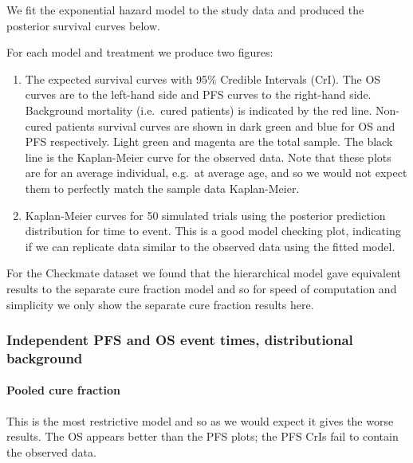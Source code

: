 \documentclass[
]{article}
\begin{document}
We fit the exponential hazard model to the study data and produced the
posterior survival curves below.

For each model and treatment we produce two figures:

\begin{enumerate}
\def\labelenumi{\arabic{enumi}.}
\item
  The expected survival curves with 95\% Credible Intervals (CrI). The
  OS curves are to the left-hand side and PFS curves to the right-hand
  side. Background mortality (i.e.~cured patients) is indicated by the
  red line. Non-cured patients survival curves are shown in dark green
  and blue for OS and PFS respectively. Light green and magenta are the
  total sample. The black line is the Kaplan-Meier curve for the
  observed data. Note that these plots are for an average individual,
  e.g.~at average age, and so we would not expect them to perfectly
  match the sample data Kaplan-Meier.
\item
  Kaplan-Meier curves for 50 simulated trials using the posterior
  prediction distribution for time to event. This is a good model
  checking plot, indicating if we can replicate data similar to the
  observed data using the fitted model.
\end{enumerate}

For the Checkmate dataset we found that the hierarchical model gave
equivalent results to the separate cure fraction model and so for speed
of computation and simplicity we only show the separate cure fraction
results here.

\hypertarget{independent-pfs-and-os-event-times-distributional-background}{%
\subsubsection{Independent PFS and OS event times, distributional
background}\label{independent-pfs-and-os-event-times-distributional-background}}

\hypertarget{pooled-cure-fraction}{%
\paragraph{Pooled cure fraction}\label{pooled-cure-fraction}}

This is the most restrictive model and so as we would expect it gives
the worse results. The OS appears better than the PFS plots; the PFS
CrIs fail to contain the observed data.
\end{document}
